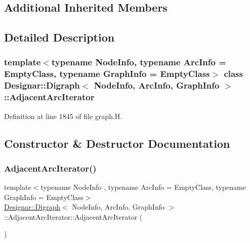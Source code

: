 \subsection*{Additional Inherited Members}


\subsection{Detailed Description}
\subsubsection*{template$<$typename Node\+Info, typename Arc\+Info = Empty\+Class, typename Graph\+Info = Empty\+Class$>$\newline
class Designar\+::\+Digraph$<$ Node\+Info, Arc\+Info, Graph\+Info $>$\+::\+Adjacent\+Arc\+Iterator}



Definition at line 1845 of file graph.\+H.



\subsection{Constructor \& Destructor Documentation}
\mbox{\label{class_designar_1_1_digraph_1_1_adjacent_arc_iterator_a44c04d22e04c7458517a41bced9338f6}} 
\subsubsection{\texorpdfstring{Adjacent\+Arc\+Iterator()}{AdjacentArcIterator()}\hspace{0.1cm}{\footnotesize\ttfamily [1/5]}}
{\footnotesize\ttfamily template$<$typename Node\+Info , typename Arc\+Info  = Empty\+Class, typename Graph\+Info  = Empty\+Class$>$ \\
\hyperlink{class_designar_1_1_digraph}{Designar\+::\+Digraph}$<$ Node\+Info, Arc\+Info, Graph\+Info $>$\+::Adjacent\+Arc\+Iterator\+::\+Adjacent\+Arc\+Iterator (\begin{DoxyParamCaption}{ }\end{DoxyParamCaption})\hspace{0.3cm}{\ttfamily [inline]}}



